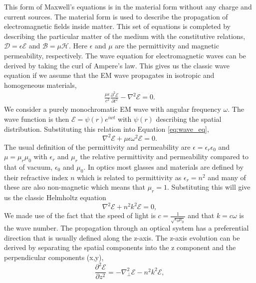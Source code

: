 \documentclass[letterpaper]{ar-1col}
\begin{document}
This form of Maxwell's equations is in the material form without any charge and current sources.
%
The material form is used to describe the propagation of electromagnetic fields inside matter.
%
This set of equations is completed by describing the particular matter of the medium with the constitutive relations, $\mathcal{D}=\epsilon \mathcal{E}$ and $\mathcal{B}=\mu \mathcal{H}$. 
%
Here $\epsilon$ and $\mu$ are the permittivity and magnetic permeability, respectively.
%
The wave equation for electromagnetic waves can be derived by taking the curl of Ampere's law.
%
This gives us the classic wave equation if we assume that the EM wave propagates in isotropic and homogeneous materials,
\begin{equation}
\label{eq:wave_eq}
\begin{aligned}
\frac{\mu \epsilon}{c^2} \frac{\partial^2 \mathcal{E}}{\partial t^2} - \nabla^2\mathcal{E} = 0 .
\end{aligned}
\end{equation}
We consider a purely monochromatic EM wave with angular frequency $\omega$.
%
The wave function is then $\mathcal{E}=\psi(r) e^{iwt}$ with $\psi(r)$ describing the spatial distribution.
%
Substituting this relation into Equation \ref{eq:wave_eq},
\begin{equation}
\nabla^2\mathcal{E} +\mu \epsilon \omega^2 \mathcal{E} = 0.
\end{equation}
The usual definition of the permittivity and permeability are $\epsilon=\epsilon_r \epsilon_0$ and $\mu=\mu_r \mu_0$ with $\epsilon_r$ and $\mu_r$ the relative permittivity and permeability compared to that of vacuum, $\epsilon_0$ and $\mu_0$.
%
In optics most glasses and materials are defined by their refractive index $n$ which is related to permittivity as $\epsilon_r = n^2$ and many of these are also non-magnetic which means that $\mu_r=1$.
%
Substituting this will give us the classic Helmholtz equation
\begin{equation}
\nabla^2\mathcal{E} + n^2k^2 \mathcal{E} = 0,
\end{equation}
We made use of the fact that the speed of light is $c = \frac{1}{\sqrt{\epsilon_0\mu_0}}$ and that $k = c\omega$ is the wave number.
%
The propagation through an optical system has a preferential direction that is usually defined along the z-axis.
%
The z-axis evolution can be derived by separating the spatial components into the z component and the perpendicular components (x,y),
\begin{equation}
\frac{\partial^2\mathcal{E}}{\partial z^2} = -\nabla_{\perp}^2\mathcal{E}-n^2k^2 \mathcal{E},
\end{equation}
\end{document}
